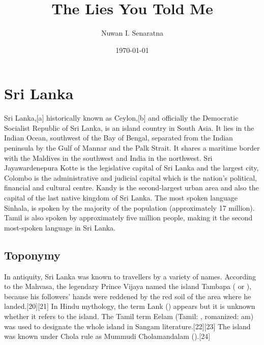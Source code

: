 \documentclass[12pt,openany]{book}
\let\oldsay\say
\renewcommand{\say}[1]{\oldsay{\textcolor{maroon}{#1}}}
\begin{document}
\frontmatter
\title{The Lies You Told Me}
\author{Nuwan I. Senaratna}
\date{\today}

\maketitle

\tableofcontents
\clearpage  

\mainmatter{}
\setcounter{chapter}{1}
\chapter*{Sri Lanka}

Sri Lanka,[a] historically known as Ceylon,[b] and officially the Democratic Socialist Republic of Sri Lanka, is an island country in South Asia. It lies in the Indian Ocean, southwest of the Bay of Bengal, separated from the Indian peninsula by the Gulf of Mannar and the Palk Strait. It shares a maritime border with the Maldives in the southwest and India in the northwest. Sri Jayawardenepura Kotte is the legislative capital of Sri Lanka and the largest city, Colombo is the administrative and judicial capital which is the nation's political, financial and cultural centre. Kandy is the second-largest urban area and also the capital of the last native kingdom of Sri Lanka. The most spoken language Sinhala, is spoken by the majority of the population (approximately 17 million). Tamil is also spoken by approximately five million people, making it the second most-spoken language in Sri Lanka.

\section*{Toponymy}

In antiquity, Sri Lanka was known to travellers by a variety of names. According to the Mahvasa, the legendary Prince Vijaya named the island Tambapa (\say{copper-red hands} or \say{copper-red earth}), because his followers' hands were reddened by the red soil of the area where he landed.[20][21] In Hindu mythology, the term Lank (\say{Island}) appears but it is unknown whether it refers to the island. The Tamil term Eelam (Tamil: , romanized: am) was used to designate the whole island in Sangam literature.[22][23] The island was known under Chola rule as Mummudi Cholamandalam (\say{realm of the three crowned Cholas}).[24]
\end{document}
